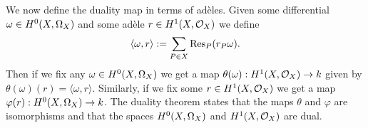 We now define the duality map in terms of ad\`eles.
Given some differential $\omega \in {H^0(X,\Omega_X)}$ and some ad\`ele $r \in H^1(X,\mathcal{O}_X)$ we define 
\[
\langle \omega, r \rangle := \sum_{P\in X} \operatorname{Res}_{P}( r_P\omega).
\]
Then if we fix any $\omega \in {H^0(X,\Omega_X)}$ we get a map $\theta(\omega):H^1(X,\mathcal{O}_X) \rightarrow k$ given by $\theta(\omega)(r) = \langle \omega, r \rangle$.
Similarly, if we fix some $r \in H^1(X,\mathcal{O}_X)$ we get a map $\varphi(r):{H^0(X,\Omega_X)} \rightarrow k$.
The duality theorem \cite[Thm. 2, Chap. II]{algebraicgroupsandclassfields} states that the maps $\theta$ and $\varphi$ are isomorphisms and that the spaces ${H^0(X,\Omega_X)}$ and $H^1(X,\mathcal{O}_X)$ are dual.


